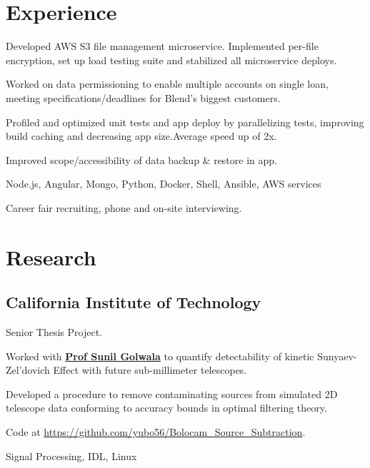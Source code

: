 \documentclass[]{yubo-resume-openfont}
\begin{document}
\hfill
\begin{minipage}[t]{0.66\textwidth}


\section{Experience}

\vspace{\topsep} %
\begin{tightemize}
    \item Developed AWS S3 file management microservice. Implemented per-file
        encryption, set up load testing suite and stabilized all microservice
        deploys.
    \item Worked on data permissioning to enable multiple accounts on single
        loan, meeting specifications/deadlines for Blend's biggest customers.
    \item Profiled and optimized unit tests and app deploy by parallelizing
        tests, improving build caching and decreasing app size.\@ Average speed
        up of 2x.
    \item Improved scope/accessibility of data backup \& restore in app.
    \item Node.js, Angular, Mongo, Python, Docker, Shell, Ansible, AWS services
    \item Career fair recruiting, phone and on-site interviewing.
\end{tightemize}
\sectionsep


\section{Research}
\subsection{California Institute of Technology}
\begin{tightemize}
    \item Senior Thesis Project.
    \item Worked with \textbf{\href{TODO}{Prof Sunil Golwala}} to quantify
        detectability of kinetic Sunyaev-Zel'dovich Effect with future
        sub-millimeter telescopes.
    \item Developed a procedure to remove contaminating sources from
        simulated 2D telescope data conforming to accuracy bounds in optimal
        filtering theory.
    \item Code at
        \url{https://github.com/yubo56/Bolocam_Source_Subtraction}.
    \item Signal Processing, IDL, Linux
\end{tightemize}
\sectionsep


\end{minipage}
\end{document}
